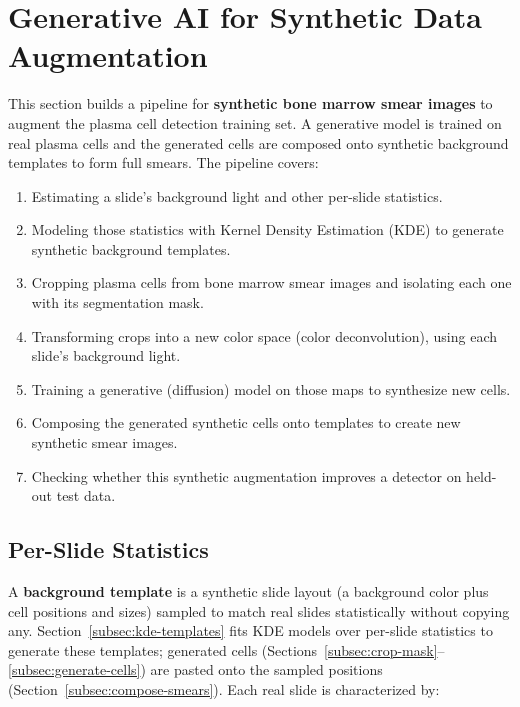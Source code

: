 %
%

\section{Generative AI for Synthetic Data Augmentation}
\label{sec:synthetic-augmentation}

This section builds a pipeline for \textbf{synthetic bone marrow smear images} to
augment the plasma cell detection training set. A generative model is trained on
real plasma cells and the generated cells are composed onto synthetic background
templates to form full smears. The pipeline covers:

\begin{enumerate}
    \item Estimating a slide's background light and other per-slide statistics.
    \item Modeling those statistics with Kernel Density Estimation (KDE) to
          generate synthetic background templates.
    \item Cropping plasma cells from bone marrow smear images and isolating each
          one with its segmentation mask.
    \item Transforming crops into a new color space (color deconvolution), using
          each slide's background light.
    \item Training a generative (diffusion) model on those maps to synthesize new
          cells.
    \item Composing the generated synthetic cells onto templates to create new
          synthetic smear images.
    \item Checking whether this synthetic augmentation improves a detector on
          held-out test data.
\end{enumerate}

\subsection{Per-Slide Statistics}
\label{subsec:per-slide-statistics}

A \textbf{background template} is a synthetic slide layout (a background color
plus cell positions and sizes) sampled to match real slides statistically without
copying any. Section~\ref{subsec:kde-templates} fits KDE models over per-slide
statistics to generate these templates; generated cells
(Sections~\ref{subsec:crop-mask}--\ref{subsec:generate-cells}) are pasted onto the
sampled positions (Section~\ref{subsec:compose-smears}). Each real slide is
characterized by:

